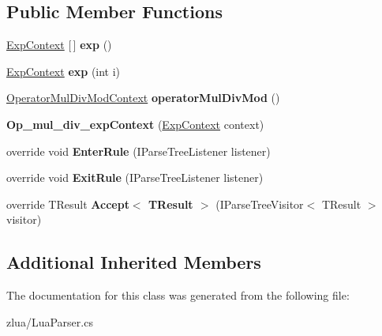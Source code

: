 \subsection*{Public Member Functions}
\begin{DoxyCompactItemize}
\item 
\mbox{\label{classzlua_1_1_lua_parser_1_1_op__mul__div__exp_context_adc7407fd2debbdd481c80533b71eb578}} 
\mbox{\hyperlink{classzlua_1_1_lua_parser_1_1_exp_context}{Exp\+Context}} \mbox{[}$\,$\mbox{]} {\bfseries exp} ()
\item 
\mbox{\label{classzlua_1_1_lua_parser_1_1_op__mul__div__exp_context_a3fbb0558d1390a85dc03028cf611439e}} 
\mbox{\hyperlink{classzlua_1_1_lua_parser_1_1_exp_context}{Exp\+Context}} {\bfseries exp} (int i)
\item 
\mbox{\label{classzlua_1_1_lua_parser_1_1_op__mul__div__exp_context_ac29c7f624e703831f2cdd312f0f5966b}} 
\mbox{\hyperlink{classzlua_1_1_lua_parser_1_1_operator_mul_div_mod_context}{Operator\+Mul\+Div\+Mod\+Context}} {\bfseries operator\+Mul\+Div\+Mod} ()
\item 
\mbox{\label{classzlua_1_1_lua_parser_1_1_op__mul__div__exp_context_af6abe74aa7bb6cd38a332965bdd2d82a}} 
{\bfseries Op\+\_\+mul\+\_\+div\+\_\+exp\+Context} (\mbox{\hyperlink{classzlua_1_1_lua_parser_1_1_exp_context}{Exp\+Context}} context)
\item 
\mbox{\label{classzlua_1_1_lua_parser_1_1_op__mul__div__exp_context_aa655c56596e1f0f5aeeb67372ad8ffe5}} 
override void {\bfseries Enter\+Rule} (I\+Parse\+Tree\+Listener listener)
\item 
\mbox{\label{classzlua_1_1_lua_parser_1_1_op__mul__div__exp_context_a2f141458db81e44fd382dcf46d47c8a9}} 
override void {\bfseries Exit\+Rule} (I\+Parse\+Tree\+Listener listener)
\item 
\mbox{\label{classzlua_1_1_lua_parser_1_1_op__mul__div__exp_context_a84c9b9b4eaece679f1ad68a21d8059e6}} 
override T\+Result {\bfseries Accept$<$ T\+Result $>$} (I\+Parse\+Tree\+Visitor$<$ T\+Result $>$ visitor)
\end{DoxyCompactItemize}
\subsection*{Additional Inherited Members}


The documentation for this class was generated from the following file\+:\begin{DoxyCompactItemize}
\item 
zlua/Lua\+Parser.\+cs\end{DoxyCompactItemize}
